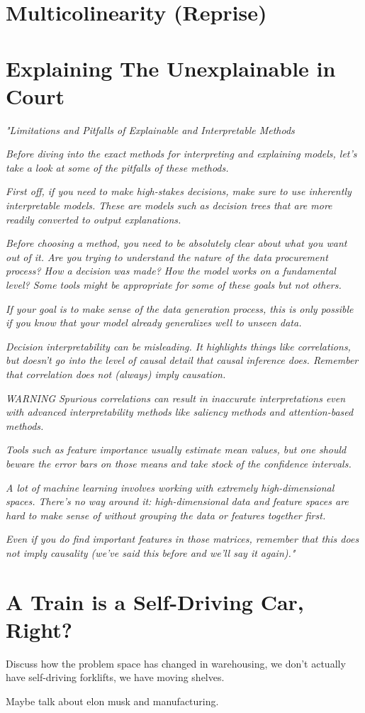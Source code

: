 \section{Multicolinearity (Reprise)}


\section{Explaining The Unexplainable in Court}

\textit{"Limitations and Pitfalls of Explainable and Interpretable Methods}

\textit{Before diving into the exact methods for interpreting and explaining models, let's take a look at some of the pitfalls of these methods.}

\textit{First off, if you need to make high-stakes decisions, make sure to use inherently interpretable models. These are models such as decision trees that are more readily converted to output explanations.}

\textit{Before choosing a method, you need to be absolutely clear about what you want out of it. Are you trying to understand the nature of the data procurement process? How a decision was made? How the model works on a fundamental level? Some tools might be appropriate for some of these goals but not others.}

\textit{If your goal is to make sense of the data generation process, this is only possible if you know that your model already generalizes well to unseen data.}

\textit{Decision interpretability can be misleading. It highlights things like correlations, but doesn’t go into the level of causal detail that causal inference does. Remember that correlation does not (always) imply causation.}

\textit{WARNING}
\textit{Spurious correlations can result in inaccurate interpretations even with advanced interpretability methods like saliency methods and attention-based methods.}

\textit{Tools such as feature importance usually estimate mean values, but one should beware the error bars on those means and take stock of the confidence intervals.}

\textit{A lot of machine learning involves working with extremely high-dimensional spaces. There's no way around it: high-dimensional data and feature spaces are hard to make sense of without grouping the data or features together first.}

\textit{Even if you do find important features in those matrices, remember that this does not imply causality (we've said this before and we'll say it again)."} \cite{}

\section{A Train is a Self-Driving Car, Right?}

Discuss how the problem space has changed in warehousing, we don't actually have self-driving forklifts, we have moving shelves.

Maybe talk about elon musk and manufacturing.

